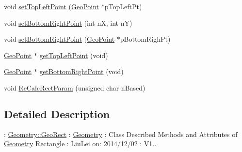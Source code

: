 \begin{DoxyCompactItemize}
\item 
void \hyperlink{class_geometry_1_1_geo_rect_abf2a90d888fe3faa615f2b3de072d5ad}{set\+Top\+Left\+Point} (\hyperlink{class_geometry_1_1_geo_point}{Geo\+Point} $\ast$p\+Top\+Left\+Pt)
\item 
void \hyperlink{class_geometry_1_1_geo_rect_a091e050fde11c418273fbf3281f5846c}{set\+Bottom\+Right\+Point} (int n\+X, int n\+Y)
\item 
void \hyperlink{class_geometry_1_1_geo_rect_a1e6d0857c47d94b050c9540cfdc9e55f}{set\+Bottom\+Right\+Point} (\hyperlink{class_geometry_1_1_geo_point}{Geo\+Point} $\ast$p\+Bottom\+Righ\+Pt)
\item 
\hyperlink{class_geometry_1_1_geo_point}{Geo\+Point} $\ast$ \hyperlink{class_geometry_1_1_geo_rect_ae7bad7c3d14dcebc703b017d9e65db5d}{get\+Top\+Left\+Point} (void)
\item 
\hyperlink{class_geometry_1_1_geo_point}{Geo\+Point} $\ast$ \hyperlink{class_geometry_1_1_geo_rect_a2381bf993ba8606df7e4166d006161dc}{get\+Bottom\+Right\+Point} (void)
\item 
void \hyperlink{class_geometry_1_1_geo_rect_ac050f36853c4f0b7b9451c45e762efcb}{Re\+Calc\+Rect\+Param} (unsigned char n\+Based)
\end{DoxyCompactItemize}


\subsection{Detailed Description}
\+: \hyperlink{class_geometry_1_1_geo_rect}{Geometry\+::\+Geo\+Rect} \+: \hyperlink{namespace_geometry}{Geometry} \+: Class Described Methods and Attributes of \hyperlink{namespace_geometry}{Geometry} Rectangle \+: Liu\+Lei  on\+: 2014/12/02 \+: V1.. 

